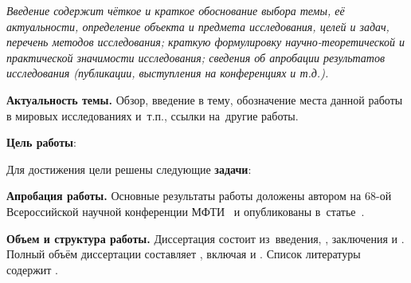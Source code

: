 \noskipnonumchapter{\introname}

\textit{Введение содержит чёткое и краткое обоснование выбора темы, её актуальности, определение объекта и предмета исследования, целей и задач, перечень методов исследования; краткую формулировку научно-теоретической и практической значимости исследования; сведения об апробации результатов исследования (публикации, выступления на конференциях и т.\:д.).}
\bigskip

\textbf{Актуальность темы.}
Обзор, введение в тему, обозначение места данной работы в мировых исследованиях и~т.\:п., ссылки на~другие работы.

\textbf{Цель работы}:
\aim

Для достижения цели решены следующие \textbf{задачи}:
\tasks

\textbf{Апробация работы.}
Основные результаты работы доложены автором на 68-ой Всероссийской научной конференции МФТИ~\cite{MIPT2026} и опубликованы в~статье~\cite{bib1}.

\textbf{Объем и структура работы.} Диссертация состоит из~введения,
,
заключения и
.
Полный объём диссертации составляет
, включая
 и
.
Список литературы содержит
.